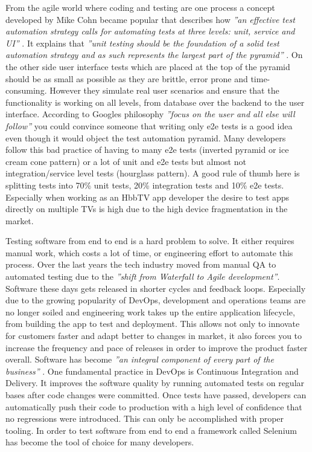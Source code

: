 From the agile world where coding and testing are one process a concept developed by Mike Cohn became popular that describes how \textit{''an effective test automation strategy calls for automating tests at three levels: unit, service and UI''} \cite{testautomation}. It explains that \textit{''unit testing should be the foundation of a solid test automation strategy and as such represents the largest part of the pyramid''} \cite{unittesting}. On the other side user interface tests which are placed at the top of the pyramid should be as small as possible as they are brittle, error prone and time-consuming. However they simulate real user scenarios and ensure that the functionality is working on all levels, from database over the backend to the user interface. According to Googles philosophy \textit{''focus on the user and all else will follow''} you could convince someone that writing only e2e tests is a good idea even though it would object the test automation pyramid. Many developers follow this bad practice of having to many e2e tests (inverted pyramid or ice cream cone pattern) or a lot of unit and e2e tests but almost not integration/service level tests (hourglass pattern). A good rule of thumb here is splitting tests into 70\% unit tests, 20\% integration tests and 10\% e2e tests. Especially when working as an HbbTV app developer the desire to test apps directly on multiple TVs is high due to the high device fragmentation in the market.

Testing software from end to end is a hard problem to solve. It either requires manual work, which costs a lot of time, or engineering effort to automate this process. Over the last years the tech industry moved from manual QA to automated testing due to the \textit{''shift from Waterfall to Agile development''}\cite{shifttoautomated}. Software these days gets released in shorter cycles and feedback loops. Especially due to the growing popularity of DevOps, development and operations teams are no longer soiled and engineering work takes up the entire application lifecycle, from building the app to test and deployment. This allows not only to innovate for customers faster and adapt better to changes in market, it also forces you to increase the frequency and pace of releases in order to improve the product faster overall. Software has become \textit{''an integral component of every part of the business''} \cite{devops}. One fundamental practice in DevOps is Continuous Integration and Delivery. It improves the software quality by running automated tests on regular bases after code changes were committed. Once tests have passed, developers can automatically push their code to production with a high level of confidence that no regressions were introduced. This can only be accomplished with proper tooling. In order to test software from end to end a framework called Selenium has become the tool of choice for many developers.

